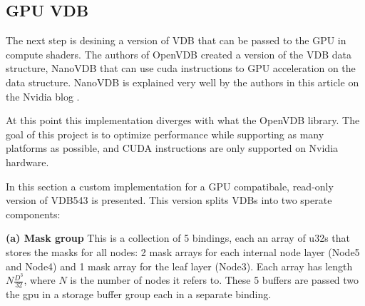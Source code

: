 \subsection{GPU VDB}

The next step is desining a version of VDB that can be passed to the GPU in compute shaders. The authors of OpenVDB created a version of the VDB data structure, NanoVDB\supercite{nanovdb:doc} that can use \acrshort{cuda} instructions to GPU acceleration on the data structure. NanoVDB is explained very well by the authors in this article on the Nvidia blog \cite{nanovdb:art}.

At this point this implementation diverges with what the OpenVDB library. The goal of this project is to optimize performance while supporting as many platforms as possible, and CUDA instructions are only supported on Nvidia hardware.

In this section a custom implementation for a GPU compatibale, read-only version of VDB543 is presented. This version splits VDBs into two sperate components:

\textbf{(a) Mask group} This is a collection of 5 bindings, each an array of u32s that stores the masks for all nodes: 2 mask arrays for each internal node layer (Node5 and Node4) and 1 mask array for the leaf layer (Node3). Each array has length $N\frac{D^{3}}{32}$, where $N$ is the number of nodes it refers to. These 5 buffers are passed two the gpu in a storage buffer group each in a separate binding.

